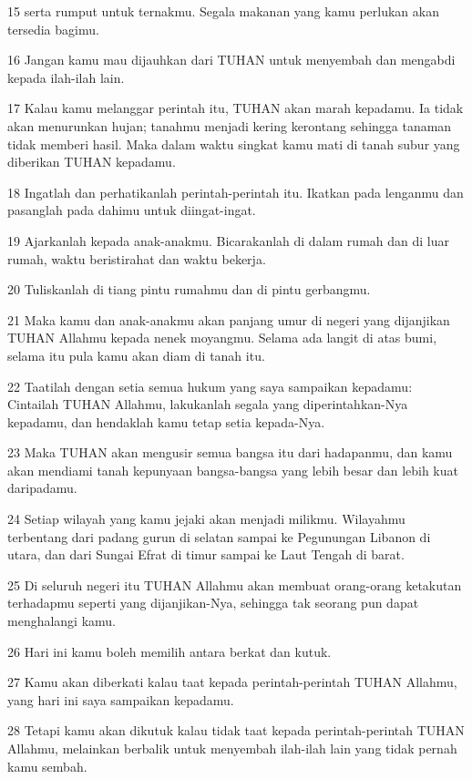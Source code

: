 \par 15 serta rumput untuk ternakmu. Segala makanan yang kamu perlukan akan tersedia bagimu.
\par 16 Jangan kamu mau dijauhkan dari TUHAN untuk menyembah dan mengabdi kepada ilah-ilah lain.
\par 17 Kalau kamu melanggar perintah itu, TUHAN akan marah kepadamu. Ia tidak akan menurunkan hujan; tanahmu menjadi kering kerontang sehingga tanaman tidak memberi hasil. Maka dalam waktu singkat kamu mati di tanah subur yang diberikan TUHAN kepadamu.
\par 18 Ingatlah dan perhatikanlah perintah-perintah itu. Ikatkan pada lenganmu dan pasanglah pada dahimu untuk diingat-ingat.
\par 19 Ajarkanlah kepada anak-anakmu. Bicarakanlah di dalam rumah dan di luar rumah, waktu beristirahat dan waktu bekerja.
\par 20 Tuliskanlah di tiang pintu rumahmu dan di pintu gerbangmu.
\par 21 Maka kamu dan anak-anakmu akan panjang umur di negeri yang dijanjikan TUHAN Allahmu kepada nenek moyangmu. Selama ada langit di atas bumi, selama itu pula kamu akan diam di tanah itu.
\par 22 Taatilah dengan setia semua hukum yang saya sampaikan kepadamu: Cintailah TUHAN Allahmu, lakukanlah segala yang diperintahkan-Nya kepadamu, dan hendaklah kamu tetap setia kepada-Nya.
\par 23 Maka TUHAN akan mengusir semua bangsa itu dari hadapanmu, dan kamu akan mendiami tanah kepunyaan bangsa-bangsa yang lebih besar dan lebih kuat daripadamu.
\par 24 Setiap wilayah yang kamu jejaki akan menjadi milikmu. Wilayahmu terbentang dari padang gurun di selatan sampai ke Pegunungan Libanon di utara, dan dari Sungai Efrat di timur sampai ke Laut Tengah di barat.
\par 25 Di seluruh negeri itu TUHAN Allahmu akan membuat orang-orang ketakutan terhadapmu seperti yang dijanjikan-Nya, sehingga tak seorang pun dapat menghalangi kamu.
\par 26 Hari ini kamu boleh memilih antara berkat dan kutuk.
\par 27 Kamu akan diberkati kalau taat kepada perintah-perintah TUHAN Allahmu, yang hari ini saya sampaikan kepadamu.
\par 28 Tetapi kamu akan dikutuk kalau tidak taat kepada perintah-perintah TUHAN Allahmu, melainkan berbalik untuk menyembah ilah-ilah lain yang tidak pernah kamu sembah.
